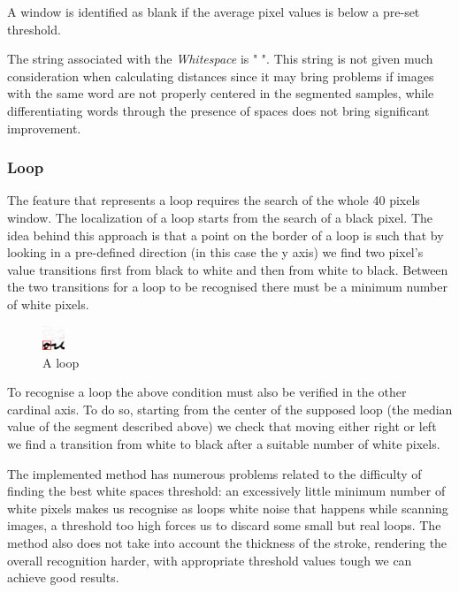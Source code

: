A window is identified as blank if the average pixel values is below a pre-set threshold.

The string associated with the \textit{Whitespace} is " ".
This string is not given much consideration when calculating distances since it may bring problems if images with the same word are not properly centered in the segmented samples, while differentiating words through the presence of spaces does not bring significant improvement.

\subsubsection{Loop}

The feature that represents a loop requires the search of the whole 40 pixels window.
The localization of a loop starts from the search of a black pixel. The idea behind this approach is that a point on the border of a loop is such that by looking in a pre-defined direction (in this case the y axis) we find two pixel's value transitions first from black to white and then from white to black. Between the two transitions for a loop to be recognised there must be a minimum number of white pixels.

\begin{figure}
  \vspace{-20pt}
  \begin{center}
    \includegraphics[width=0.06\textwidth]{images/loop.jpg}
  \end{center}
  \vspace{-20pt}
  \caption{A loop}
  \vspace{-10pt}
\end{figure}

To recognise a loop the above condition must also be verified in the other cardinal axis. To do so, starting from the center of the supposed loop (the median value of the segment described above) we check that moving either right or left we find a transition from white to black after a suitable number of white pixels.

The implemented method has numerous problems related to the difficulty of finding the best white spaces threshold: an excessively little minimum number of white pixels makes us recognise as loops white noise that happens while scanning images, a threshold too high forces us to discard some small but real loops. The method also does not take into account the thickness of the stroke, rendering the overall recognition harder, with appropriate threshold values tough we can achieve good results.


